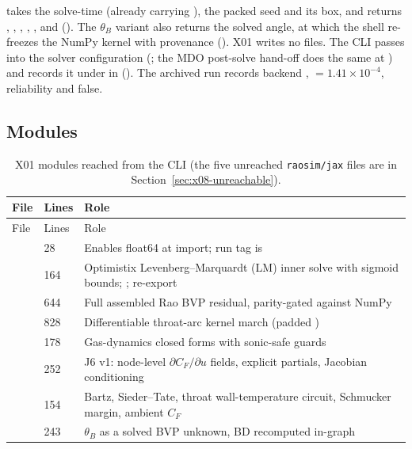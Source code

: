  takes the solve-time  (already carrying ), the packed seed and its box, and returns , , , , ,  and  (). The $\theta_B$ variant also returns the solved angle, at which the shell re-freezes the NumPy kernel with provenance  (). X01 writes no files. The CLI passes  into the solver configuration (; the MDO post-solve hand-off does the same at ) and records it under  in  (). The archived run  records backend ,  $=1.41\times10^{-4}$, reliability  and  false.

\subsection{Modules}

\begingroup\chtenTables
\begin{longtable}{@{}P{4.2cm}P{0.8cm}P{11.4cm}@{}}
\caption{X01 modules reached from the CLI (the five unreached \texttt{raosim/jax} files are in Section~\ref{sec:x08-unreachable}).}\label{tab:x01-modules}\\
\toprule File & Lines & Role \\ \midrule\endfirsthead
\toprule File & Lines & Role \\ \midrule\endhead
{} & 28 & Enables float64 at import; run tag  is  \\
 & 164 & Optimistix Levenberg--Marquardt (LM) inner solve with sigmoid bounds; ;  re-export \\
 & 644 & Full assembled Rao BVP residual, parity-gated against NumPy \\
 & 828 & Differentiable throat-arc kernel march (padded ) \\
 & 178 & Gas-dynamics closed forms with sonic-safe guards \\
 & 252 & J6 v1: node-level $\partial C_F/\partial u$ fields, explicit partials, Jacobian conditioning \\
 & 154 & Bartz, Sieder--Tate, throat wall-temperature circuit, Schmucker margin, ambient $C_F$ \\
 & 243 & $\theta_B$ as a solved BVP unknown, BD recomputed in-graph \\
\bottomrule
\end{longtable}
\endgroup

